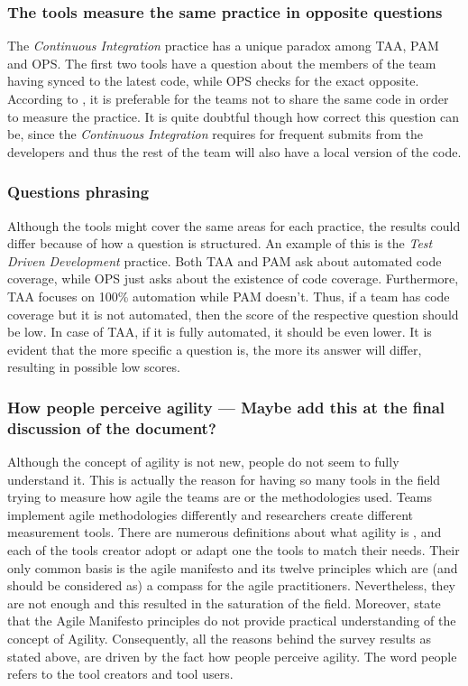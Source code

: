 \subsubsection{The tools measure the same practice in opposite questions}
The \textit{Continuous Integration} practice has a unique paradox among TAA, PAM and OPS. The first two tools have a question about the members of the team having synced to the latest code, while OPS checks for the exact opposite. According to \citet{sventha_dissertation}, it is preferable for the teams not to share the same code in order to measure the practice. It is quite doubtful though how correct this question can be, since the \textit{Continuous Integration} requires for frequent submits from the developers and thus the rest of the team will also have a local version of the code.

\subsubsection{Questions phrasing}
Although the tools might cover the same areas for each practice, the results could differ because of how a question is structured. An example of this is the \textit{Test Driven Development} practice. Both TAA and PAM ask about automated code coverage, while OPS just asks about the existence of code coverage. Furthermore, TAA focuses on 100\% automation while PAM doesn’t. Thus, if a team has code coverage but it is not automated, then the score of the respective question should be low. In case of TAA, if it is fully automated, it should be even lower. It is evident that the more specific a question is, the more its answer will differ, resulting in possible low scores.

\subsubsection{How people perceive agility --- Maybe add this at the final discussion of the document?}
Although the concept of agility is not new, people do not seem to fully understand it. This is actually the reason for having so many tools in the field trying to measure how agile the teams are or the methodologies used. Teams implement agile methodologies differently and researchers create different measurement tools. There are numerous definitions about what agility is \cite{Kidd, NagelDove, Kara, Ramesh}, and each of the tools creator adopt or adapt one the tools to match their needs. Their only common basis is the agile manifesto \cite{beck2001agile} and its twelve principles \cite{agile_principles} which are (and should be considered as) a compass for the agile practitioners. Nevertheless, they are not enough and this resulted in the saturation of the field. Moreover, \citet{conboy_fitzgerald} state that the Agile Manifesto principles do not provide practical understanding of the concept of Agility. Consequently, all the reasons behind the survey results as stated above, are driven by the fact how people perceive agility. The word people refers to the tool creators and tool users.

